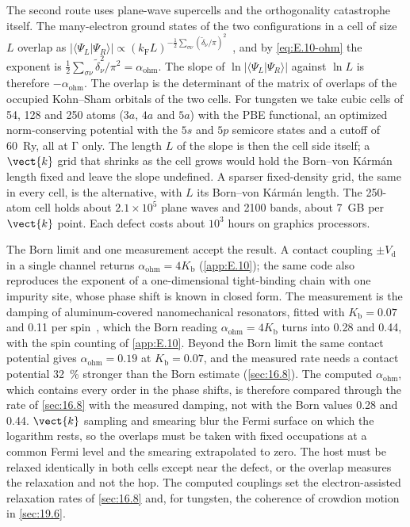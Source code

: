 The second route uses plane-wave supercells and the orthogonality catastrophe itself. The many-electron ground states of the two configurations in a cell of size $L$ overlap as $|\langle\Psi_L|\Psi_R\rangle| \propto (k_{\mathrm{F}}L)^{-\frac12\sum_{\sigma\nu}(\tilde\delta_\nu/\pi)^2}$~\cite{anderson1967infrared}, and by \cref{eq:E.10-ohm} the exponent is $\tfrac12\sum_{\sigma\nu}\tilde\delta_\nu^2/\pi^2 = \alpha_{\mathrm{ohm}}$. The slope of $\ln|\langle\Psi_L|\Psi_R\rangle|$ against $\ln L$ is therefore $-\alpha_{\mathrm{ohm}}$. The overlap is the determinant of the matrix of overlaps of the occupied Kohn--Sham orbitals of the two cells. For tungsten we take cubic cells of 54, 128 and 250 atoms ($3a$, $4a$ and $5a$) with the PBE functional, an optimized norm-conserving potential with the $5s$ and $5p$ semicore states and a cutoff of \SI{60}{Ry}, all at $\mathrm{\Gamma}$ only. The length $L$ of the slope is then the cell side itself; a $\vect{k}$ grid that shrinks as the cell grows would hold the Born--von K\'arm\'an length fixed and leave the slope undefined. A sparser fixed-density grid, the same in every cell, is the alternative, with $L$ its Born--von K\'arm\'an length. The 250-atom cell holds about $2.1\times10^5$ plane waves and 2100 bands, about \SI{7}{GB} per $\vect{k}$ point. Each defect costs about $10^3$ hours on graphics processors.

The Born limit and one measurement accept the result. A contact coupling $\pm V_{\mathrm{d}}$ in a single channel returns $\alpha_{\mathrm{ohm}} = 4K_{\mathrm{b}}$ (\cref{app:E.10}); the same code also reproduces the exponent of a one-dimensional tight-binding chain with one impurity site, whose phase shift is known in closed form. The measurement is the damping of aluminum-covered nanomechanical resonators, fitted with $K_{\mathrm{b}} = 0.07$ and 0.11 per spin~\cite{maillet2023nanomechanical}, which the Born reading $\alpha_{\mathrm{ohm}} = 4K_{\mathrm{b}}$ turns into 0.28 and 0.44, with the spin counting of \cref{app:E.10}. Beyond the Born limit the same contact potential gives $\alpha_{\mathrm{ohm}} = 0.19$ at $K_{\mathrm{b}} = 0.07$, and the measured rate needs a contact potential \SI{32}{\percent} stronger than the Born estimate (\cref{sec:16.8}). The computed $\alpha_{\mathrm{ohm}}$, which contains every order in the phase shifts, is therefore compared through the rate of \cref{sec:16.8} with the measured damping, not with the Born values 0.28 and 0.44. $\vect{k}$ sampling and smearing blur the Fermi surface on which the logarithm rests, so the overlaps must be taken with fixed occupations at a common Fermi level and the smearing extrapolated to zero. The host must be relaxed identically in both cells except near the defect, or the overlap measures the relaxation and not the hop. The computed couplings set the electron-assisted relaxation rates of \cref{sec:16.8} and, for tungsten, the coherence of crowdion motion in \cref{sec:19.6}.

